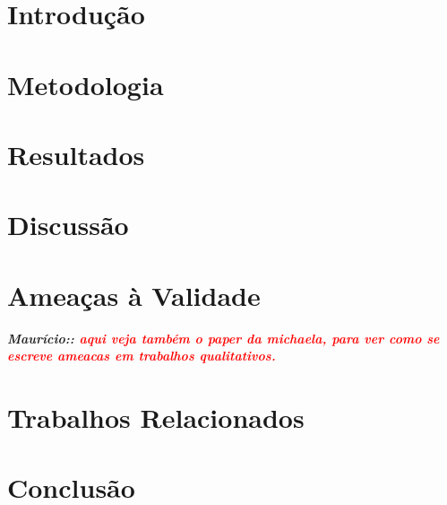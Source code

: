 \documentclass[sigconf]{acmart}
\newcommand{\remark}[2]{{\small\textsl{\textbf{#1: #2}}}}
\newcommand{\mau}[1]{\remark{Maurício:}{\textcolor{red}{#1}}}
\begin{document}



\maketitle

\section{Introdução}


\section{Metodologia}
\label{metodologia}


\section{Resultados}
\label{resultados}



\section{Discussão}
\label{discussao}


\section{Ameaças à Validade}
\label{ameacas}
\mau{aqui veja também o paper da michaela, para ver como se escreve ameacas em trabalhos qualitativos.}


\section{Trabalhos Relacionados}
\label{relacionados}


\section{Conclusão}
\label{conclusao}




 
\end{document}

